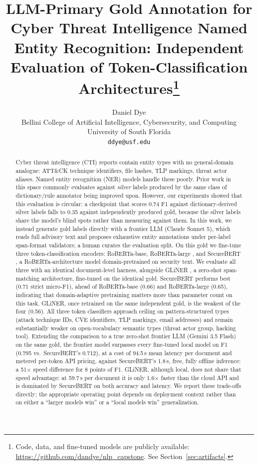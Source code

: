 \documentclass[11pt]{article}
\title{LLM-Primary Gold Annotation for Cyber Threat Intelligence Named Entity Recognition: Independent Evaluation of Token-Classification Architectures\thanks{Code, data, and fine-tuned models are publicly available: \url{https://github.com/dandye/nlp_capstone}. See Section~\ref{sec:artifacts}.}}
\author{Daniel Dye \\
  Bellini College of Artificial Intelligence, Cybersecurity, and Computing \\
  University of South Florida \\
  \texttt{ddye@usf.edu}}
\begin{document}
\maketitle

\begin{abstract}
Cyber threat intelligence (CTI) reports contain entity types with no
general-domain analogue: ATT\&CK technique identifiers, file hashes, TLP
markings, threat actor aliases. Named entity recognition
(NER) models handle these poorly. Prior work in this space commonly evaluates
against \emph{silver} labels produced by the same class of dictionary/rule
annotator being improved upon. However, our experiments showed that
this evaluation is circular: a checkpoint that scores 0.74 F1 against
dictionary-derived silver labels falls to 0.35 against independently produced
gold, because the silver labels share the model's blind spots rather than
measuring against them. In this work, we instead generate gold labels directly with a
frontier LLM (Claude Sonnet 5), which reads full advisory text and proposes
exhaustive entity annotations under per-label span-format validators; a human
curates the evaluation split. On this gold we fine-tune three
token-classification encoders: RoBERTa-base, RoBERTa-large
\citep{liu2019roberta}, and SecureBERT \citep{aghaei2022securebert}, a
RoBERTa-architecture model domain-pretrained on security text. We evaluate
all three with an identical document-level harness, alongside GLiNER
\citep{zaratiana2024gliner}, a zero-shot span-matching architecture,
fine-tuned on the identical gold. SecureBERT performs best (0.71 strict
micro-F1), ahead of RoBERTa-base (0.66) and RoBERTa-large (0.65), indicating
that domain-adaptive pretraining matters more than parameter count on this
task. GLiNER, once retrained on the same independent gold, is the weakest of
the four (0.56). All three token classifiers
approach ceiling on pattern-structured types (attack technique IDs, CVE
identifiers, TLP markings, email addresses) and remain substantially weaker
on open-vocabulary semantic types (threat actor group, hacking tool).
Extending the comparison to a true zero-shot frontier LLM (Gemini 3.5 Flash)
on the same gold, the frontier model surpasses every fine-tuned local model
on F1 (0.795 vs.\ SecureBERT's 0.712), at a cost of 94.5\,s mean latency per
document and metered per-token API pricing, against SecureBERT's 1.8\,s,
free, fully offline inference: a 51$\times$ speed difference for 8 points of
F1. GLiNER, although local, does not share that speed advantage: at 59.7\,s
per document it is only 1.6$\times$ faster than the cloud API and is
dominated by SecureBERT on both accuracy and latency. We report these
trade-offs directly; the appropriate operating point depends on deployment
context rather than on either a ``larger models win'' or a ``local models
win'' generalization.
\end{abstract}
\end{document}
